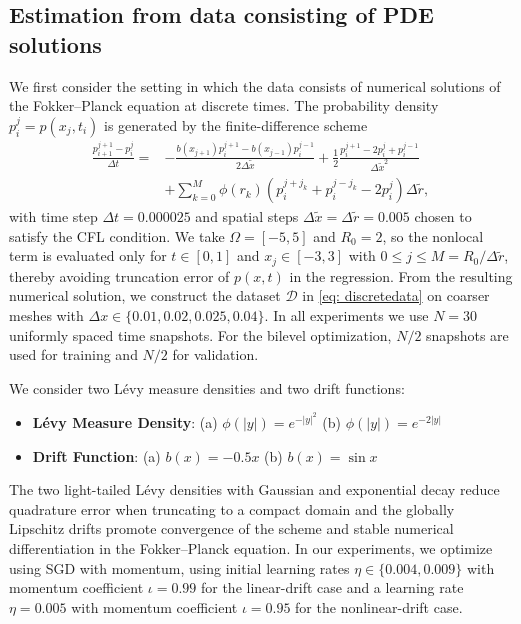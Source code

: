 \documentclass[12pt]{article}
\numberwithin{equation}{section}
\numberwithin{theorem}{section}
\begin{document}
\subsection{ Estimation from data consisting of PDE solutions}
\label{subSec:iterative}
We first consider the setting in which the data consists of numerical solutions of the Fokker--Planck equation at discrete times. The probability density $p^j_{i}= p(x_j,t_i)$ is generated by the finite-difference scheme
\begin{equation}
\label{eq: DFM}
\begin{aligned}
\frac{p_{i+1}^{j+1}-p_{i}^j}{\Delta t}= & -\frac{b\left(x_{j+1}\right) p_{i}^{j+1}-b\left(x_{j-1}\right) p_{i}^{j-1}}{2 \Delta \tilde{x}}+\frac{1}{2} \frac{p_{i}^{j+1}-2 p_{i}^j+p_{i}^{j-1}}{\Delta \tilde{x}^2} \\
& +\sum_{k=0}^M \phi\left(r_k\right)\left(p_{i}^{j+j_k}+p_{i}^{j-j_k}-2 p_{i}^j\right) \Delta \tilde{r},
\end{aligned}
\end{equation}
with time step $\Delta t = 0.000025$ and spatial steps $\Delta \tilde{x} = \Delta \tilde{r} = 0.005$ chosen to satisfy the CFL condition. We take $\Omega = [-5,5]$ and $R_0 = 2$, so the nonlocal term is evaluated only for $t \in [0,1]$ and $x_j \in [-3,3]$ with $0\leq j\leq M= R_0/\Delta \tilde{r}$, thereby avoiding truncation error of $p(x,t)$ in the regression. From the resulting numerical solution, we construct the dataset $\mathcal{D}$ in \eqref{eq: discretedata} on coarser meshes with $\Delta x \in \{0.01, 0.02, 0.025, 0.04\}$. In all experiments we use $N = 30$ uniformly spaced time snapshots. For the bilevel optimization, $N/2$ snapshots are used for training and $N/2$ for validation.

We consider two L\'evy measure densities and two drift functions:
\begin{itemize}
\item[-] \textbf{L\'evy Measure Density}: (a) $\phi(|y|)=e^{-|y|^2}$ (b)  $\phi(|y|) = e^{-2|y|}$
\item[-]  \textbf{Drift Function}: (a) $b(x) = -0.5x$ (b) $b(x) = \sin x$
\end{itemize}
The two light-tailed L\'evy densities with Gaussian and exponential decay reduce quadrature error when truncating to a compact domain and the globally Lipschitz drifts promote convergence of the scheme and stable numerical differentiation in the Fokker–Planck equation. In our experiments, we optimize using SGD with momentum, using  initial learning rates $\eta \in \{0.004,0.009\}$ with momentum coefficient $\iota =0.99$ for the linear-drift case and a learning rate $\eta=0.005$ with momentum coefficient $\iota=0.95$ for the nonlinear-drift case.
 
\end{document}
